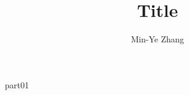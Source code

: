 \documentclass[a4paper,12pt]{article}
\title{Title}
\author{Min-Ye Zhang}
\begin{document}
\maketitle
{part01}
\end{document}
